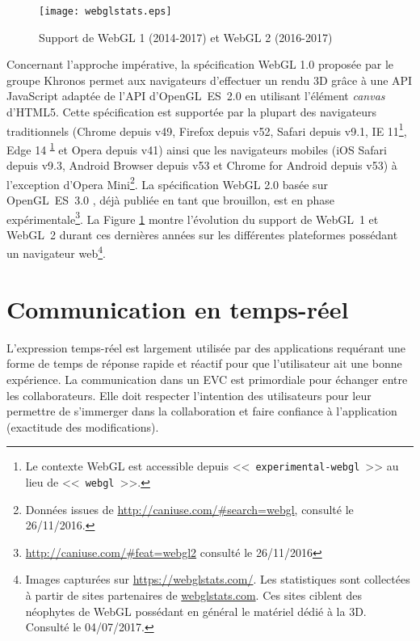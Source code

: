 
\begin{figure}[hbt]
	\centering
	\texttt{[image: webglstats.eps]}
	\caption{Support de WebGL 1 (2014-2017) et WebGL 2 
		(2016-2017)}
	\label{fig:webglstats}
\end{figure}

Concernant l'approche impérative, la spécification WebGL 1.0 \cite{Khronos2011} 
proposée par le groupe Khronos permet aux navigateurs d'effectuer un rendu 
\gls{3D} 
grâce à une \gls{API} JavaScript adaptée de l'\gls{API} d'OpenGL~ES~2.0 
\cite{Khronos2007} en utilisant l'élément \textit{canvas} d'\gls{HTML}5. Cette 
spécification est supportée par la plupart des navigateurs traditionnels (Chrome 
depuis v49, Firefox depuis v52, Safari depuis v9.1, IE 11\footnote{Le contexte 
	WebGL est accessible depuis <<~\texttt{experimental-webgl}~>> au lieu de 
	<<~\texttt{webgl}~>>.\label{fn:webglcontext}}, Edge 14\textsuperscript{ 
	\ref{fn:webglcontext}} et Opera depuis v41) ainsi que les navigateurs mobiles 
	(iOS 
Safari depuis v9.3, Android Browser depuis v53 et Chrome for Android depuis v53) 
à l'exception d'Opera Mini\footnote{Données issues de 
	\url{http://caniuse.com/\#search=webgl}, consulté le 26/11/2016.}. La 
	spécification 
WebGL 2.0 \cite{Khronos2016} basée sur OpenGL~ES~3.0 \cite{Khronos2008}, 
déjà publiée en tant que brouillon, est en phase 
expérimentale\footnote{\url{http://caniuse.com/\#feat=webgl2} consulté le 
	26/11/2016}. La Figure 
\ref{fig:webglstats} montre l'évolution du support de WebGL~1 et WebGL~2 durant 
ces dernières années sur les différentes plateformes possédant un navigateur 
web\footnote{Images capturées sur \url{https://webglstats.com/}. Les statistiques 
	sont collectées à partir de sites partenaires de \url{webglstats.com}. Ces sites 
	ciblent des néophytes de WebGL possédant  en général le matériel 
	dédié à la \gls{3D}. Consulté le 04/07/2017.}.

\section{Communication en temps-réel}
L'expression temps-réel est largement utilisée par des applications requérant une 
forme de temps de réponse rapide et réactif pour que l'utilisateur ait une bonne 
expérience. La communication dans un \gls{EVC} est primordiale pour échanger entre les collaborateurs. Elle doit respecter l'intention des utilisateurs pour leur permettre de s'immerger dans la collaboration et faire confiance à l'application (exactitude des modifications).

